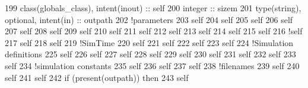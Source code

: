 \begin{DoxyCode}
199     \textcolor{keywordtype}{class}(globals\_class), \textcolor{keywordtype}{intent(inout)} :: self
200     \textcolor{keywordtype}{integer} :: sizem
201     \textcolor{keywordtype}{type}(string), \textcolor{keywordtype}{optional}, \textcolor{keywordtype}{intent(in)} :: outpath
202     \textcolor{comment}{!parameters}
203     self%
204     self%
205     self%
206     self%
207     self%
208     self%
209     self%
210     self%
211     self%
212     self%
213     self%
214     self%
215     self%
216     \textcolor{comment}{!self%
217     self%
218     self%
219     \textcolor{comment}{!SimTime}
220     self%
221     self%
222     self%
223     self%
224     \textcolor{comment}{!Simulation definitions}
225     self%
226     self%
227     self%
228     self%
229     self%
230     self%
231     self%
232     self%
233     self%
234     \textcolor{comment}{!simulation constants}
235     self%
236     self%
237     self%
238     \textcolor{comment}{!filenames}
239     self%
240     self%
241     self%
242     \textcolor{keywordflow}{if} (\textcolor{keyword}{present}(outpath)) \textcolor{keywordflow}{then}
243         self%
}
\end{DoxyCode}
